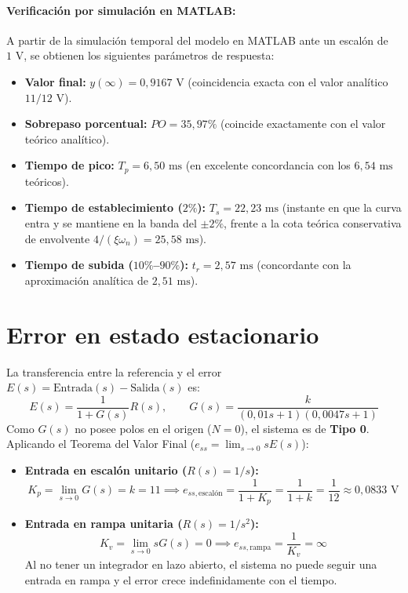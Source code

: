 \documentclass[11pt,a4paper]{article}
\begin{document}
\paragraph{Verificación por simulación en MATLAB:}
A partir de la simulación temporal del modelo en MATLAB ante un escalón de $1\text{ V}$, se obtienen los siguientes parámetros de respuesta:
\begin{itemize}
    \item \textbf{Valor final:} $y(\infty) = 0,9167\text{ V}$ (coincidencia exacta con el valor analítico $11/12\text{ V}$).
    \item \textbf{Sobrepaso porcentual:} $PO = 35,97\%$ (coincide exactamente con el valor teórico analítico).
    \item \textbf{Tiempo de pico:} $T_p = 6,50\text{ ms}$ (en excelente concordancia con los $6,54\text{ ms}$ teóricos).
    \item \textbf{Tiempo de establecimiento ($2\%$):} $T_s = 22,23\text{ ms}$ (instante en que la curva entra y se mantiene en la banda del $\pm 2\%$, frente a la cota teórica conservativa de envolvente $4/(\xi\omega_n) = 25,58\text{ ms}$).
    \item \textbf{Tiempo de subida ($10\%$--$90\%$):} $t_r = 2,57\text{ ms}$ (concordante con la aproximación analítica de $2,51\text{ ms}$).
\end{itemize}

\section{Error en estado estacionario}
La transferencia entre la referencia y el error $E(s) = \text{Entrada}(s) - \text{Salida}(s)$ es:
\begin{equation}
    E(s) = \frac{1}{1 + G(s)} R(s), \qquad G(s) = \frac{k}{(0,01 s + 1)(0,0047 s + 1)}
\end{equation}
Como $G(s)$ no posee polos en el origen ($N = 0$), el sistema es de \textbf{Tipo 0}. Aplicando el Teorema del Valor Final ($e_{ss} = \lim_{s \to 0} s E(s)$):

\begin{itemize}
    \item \textbf{Entrada en escalón unitario ($R(s) = 1/s$):}
    \begin{equation}
        K_p = \lim_{s \to 0} G(s) = k = 11 \implies e_{ss,\text{escalón}} = \frac{1}{1 + K_p} = \frac{1}{1 + k} = \frac{1}{12} \approx 0,0833\text{ V}
    \end{equation}
    \item \textbf{Entrada en rampa unitaria ($R(s) = 1/s^2$):}
    \begin{equation}
        K_v = \lim_{s \to 0} s G(s) = 0 \implies e_{ss,\text{rampa}} = \frac{1}{K_v} = \infty
    \end{equation}
    Al no tener un integrador en lazo abierto, el sistema no puede seguir una entrada en rampa y el error crece indefinidamente con el tiempo.
\end{itemize}
\end{document}
